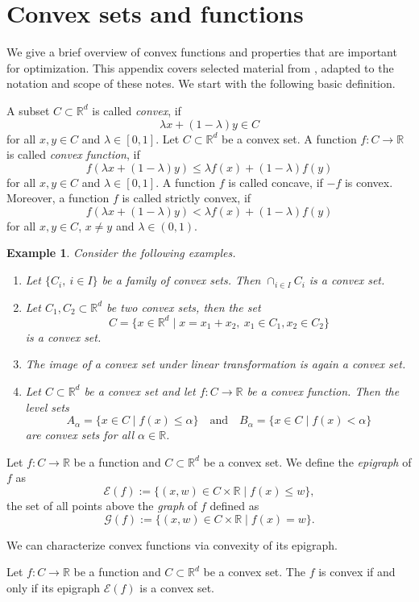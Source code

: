 \documentclass[12pt,openany]{book}
\newtheorem{example}[thm]{Example}
\theoremstyle{definition}
\theoremstyle{definition}
\newcommand{\R}{\mathbb{R}}
\begin{document}
\section{Convex sets and functions}\label{app:convex}
We give a brief overview of convex functions and properties that are important for optimization. This appendix covers selected material from \cite[Appendix~B]{DPB15}, adapted to
the notation and scope of these notes. We start with the following basic definition.
\begin{defi}
A subset $C\subset \R^d$ is called \textit{convex}, if 
\[\lambda x + (1-\lambda) y \in C \]
for all $x,y\in C$ and $\lambda\in[0,1]$. 
Let $C\subset\R^d$ be a convex set. A function $f:C\to\R$ is called \textit{convex function}, if 
\[f(\lambda x + (1-\lambda) y) \le \lambda f(x) + (1-\lambda) f(y)\]
for all $x,y\in C$ and $\lambda\in[0,1]$. A function $f$ is called concave, if $-f$ is convex. Moreover, a function $f$ is called strictly convex, if
\[f(\lambda x+ (1-\lambda)y)< \lambda f(x) + (1-\lambda) f(y) \]
for all $x,y\in C$, $x\neq y$ and $\lambda\in(0,1)$.
\end{defi}

\begin{example}
Consider the following examples.
\begin{enumerate}
\item Let $\{C_i,\ i\in I\}$ be a family of convex sets. Then $\cap_{i\in I} C_i$ is a convex set. 
\item Let $C_1,C_2\subset \R^d$ be two convex sets, then the set
\[C = \{ x\in\R^d\mid x = x_1+x_2,\ x_1\in C_1, x_2\in C_2\} \]
is a convex set.
\item The image of a convex set under linear transformation is again a convex set. 
\item Let $C\subset\R^d$ be a convex set and let $f:C\to\R$ be a convex function. Then the level sets 
\[ A_\alpha = \{x\in C\mid f(x)\le \alpha\} \quad \text{and}\quad B_\alpha = \{x\in C\mid f(x)<\alpha\} \]
are convex sets for all $\alpha \in \R$.
\end{enumerate}
\end{example}

\begin{defi}
Let $f:C\to\R$ be a function and $C\subset\R^d$ be a convex set. We define the \textit{epigraph} of $f$ as
\[\mathcal E(f) := \{(x,w)\in C\times \R \mid f(x)\le w \},  \]
the set of all points above the \textit{graph} of $f$ defined as
\[\mathcal G(f) := \{(x,w)\in C\times \R \mid f(x)= w \}. \]
\end{defi}
We can characterize convex functions via convexity of its epigraph.
\begin{prop}[Fact]
Let $f:C\to\R$ be a function and $C\subset \R^d$ be a convex set. The $f$ is convex if and only if its epigraph $\mathcal E(f)$ is a convex set.
\end{prop}
\end{document}
